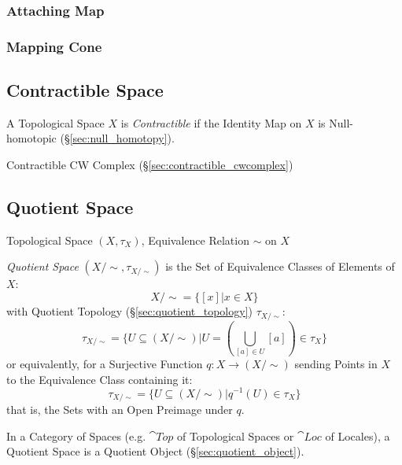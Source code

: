 \subsubsection{Attaching Map}\label{sec:attaching_map}

\subsubsection{Mapping Cone}\label{sec:mapping_cone}



\subsection{Contractible Space}\label{sec:contractible_space}

A Topological Space $X$ is \emph{Contractible} if the Identity Map on
$X$ is Null-homotopic (\S\ref{sec:null_homotopy}).

Contractible CW Complex (\S\ref{sec:contractible_cwcomplex})



\subsection{Quotient Space}\label{sec:quotient_space}

Topological Space $(X, \tau_X)$, Equivalence Relation $\sim$ on $X$

\emph{Quotient Space} $(X/\sim, \tau_{X/\sim})$ is the Set of Equivalence
Classes of Elements of $X$:
\[
  X / \sim = \{ [x] | x \in X \}
\]
with Quotient Topology (\S\ref{sec:quotient_topology}) $\tau_{X/\sim}$:
\[
  \tau_{X/\sim} = \{ U \subseteq (X/\sim) |
    U = (\bigcup_{[a] \in U} [a]) \in \tau_X \}
\]
or equivalently, for a Surjective Function $q : X \rightarrow (X / \sim)$
sending Points in $X$ to the Equivalence Class containing it:
\[
  \tau_{X/\sim} = \{ U \subseteq (X/\sim) | q^{-1}(U) \in \tau_X \}
\]
that is, the Sets with an Open Preimage under $q$.

In a Category of Spaces (e.g. $\cat{Top}$ of Topological Spaces or $\cat{Loc}$
of Locales), a Quotient Space is a Quotient Object
(\S\ref{sec:quotient_object}).

